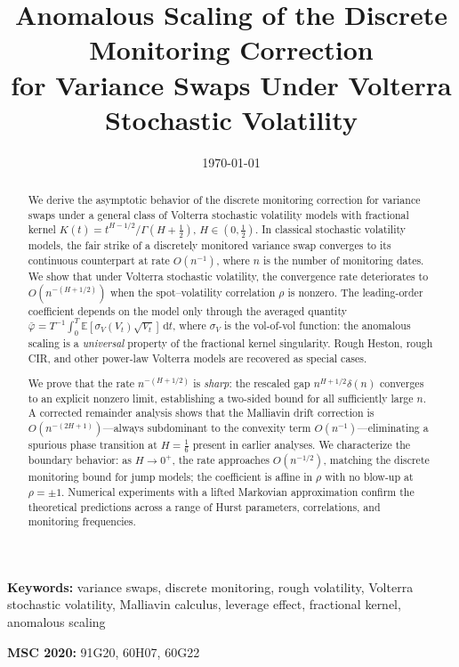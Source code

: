 \documentclass[12pt]{article}
\title{Anomalous Scaling of the Discrete Monitoring Correction\\
for Variance Swaps Under Volterra Stochastic Volatility}
\author{}
\date{\today}
\theoremstyle{definition}
\newcommand{\E}{\mathbb{E}}
\newcommand{\dd}{\mathrm{d}}
\begin{document}
\maketitle

\begin{abstract}
We derive the asymptotic behavior of the discrete monitoring correction for
variance swaps under a general class of Volterra stochastic volatility models
with fractional kernel $K(t) = t^{H-1/2}/\Gamma(H+\tfrac12)$,
$H \in (0,\tfrac12)$. In classical stochastic volatility models, the fair
strike of a discretely monitored variance swap converges to its continuous
counterpart at rate $O(n^{-1})$, where $n$ is the number of monitoring dates.
We show that under Volterra stochastic volatility, the convergence rate
deteriorates to $O(n^{-(H+1/2)})$ when the spot--volatility correlation
$\rho$ is nonzero. The leading-order coefficient depends on the model
only through the averaged quantity
$\bar\varphi = T^{-1}\!\int_0^T\!\E[\sigma_V(V_t)\sqrt{V_t}]\,\dd t$,
where $\sigma_V$ is the vol-of-vol function: the anomalous scaling is a
\emph{universal} property of the fractional kernel singularity.
Rough Heston, rough CIR, and other power-law Volterra models are
recovered as special cases.

We prove that the rate $n^{-(H+1/2)}$ is \emph{sharp}: the rescaled gap
$n^{H+1/2}\delta(n)$ converges to an explicit nonzero limit, establishing
a two-sided bound for all sufficiently large $n$.
A corrected remainder analysis shows that the Malliavin drift correction
is $O(n^{-(2H+1)})$---always subdominant to the convexity term
$O(n^{-1})$---eliminating a spurious phase transition at $H = \tfrac16$
present in earlier analyses.
We characterize the boundary behavior: as $H \to 0^+$,
the rate approaches $O(n^{-1/2})$, matching the discrete monitoring bound
for jump models; the coefficient is affine in $\rho$ with no blow-up at
$\rho = \pm 1$.
Numerical experiments with a lifted Markovian approximation confirm
the theoretical predictions across a range of Hurst parameters,
correlations, and monitoring frequencies.
\end{abstract}

\medskip\noindent
\textbf{Keywords:} variance swaps, discrete monitoring, rough volatility,
Volterra stochastic volatility, Malliavin calculus, leverage effect,
fractional kernel, anomalous scaling

\medskip\noindent
\textbf{MSC 2020:} 91G20, 60H07, 60G22

\end{document}
